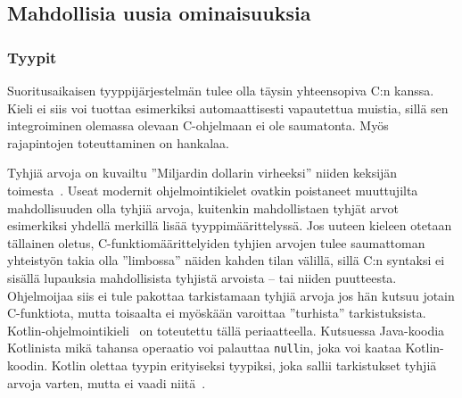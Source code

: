 \FloatBarrier

\newpage

\subsection{Mahdollisia uusia ominaisuuksia}

\subsubsection{Tyypit}

Suoritusaikaisen tyyppijärjestelmän tulee olla täysin yhteensopiva C:n kanssa. Kieli
ei siis voi tuottaa esimerkiksi automaattisesti vapautettua muistia, sillä sen
integroiminen olemassa olevaan C-ohjelmaan ei ole saumatonta. Myös rajapintojen
toteuttaminen on hankalaa.

Tyhjiä arvoja on kuvailtu ''Miljardin dollarin virheeksi'' niiden keksijän
toimesta~\citep{billiondollars}. Useat modernit ohjelmointikielet ovatkin
poistaneet muuttujilta mahdollisuuden olla tyhjiä arvoja, kuitenkin
mahdollistaen tyhjät arvot esimerkiksi yhdellä merkillä lisää
tyyppimäärittelyssä. Jos uuteen kieleen otetaan tällainen oletus,
C-funktiomäärittelyiden tyhjien arvojen tulee saumattoman yhteistyön takia olla
''limbossa'' näiden kahden tilan välillä, sillä C:n syntaksi ei sisällä
lupauksia mahdollisista tyhjistä arvoista -- tai niiden puutteesta. Ohjelmoijaa
siis ei tule pakottaa tarkistamaan tyhjiä arvoja jos hän kutsuu jotain
C-funktiota, mutta toisaalta ei myöskään varoittaa ''turhista'' tarkistuksista.
Kotlin-ohjelmointikieli~\citep{kotlin} on toteutettu tällä periaatteella.
Kutsuessa Java-koodia Kotlinista mikä tahansa operaatio voi palauttaa
\texttt{null}in, joka voi kaataa Kotlin-koodin. Kotlin olettaa tyypin
erityiseksi tyypiksi, joka sallii tarkistukset tyhjiä arvoja varten, mutta ei
vaadi niitä~\citep{kotlinnullability}.


